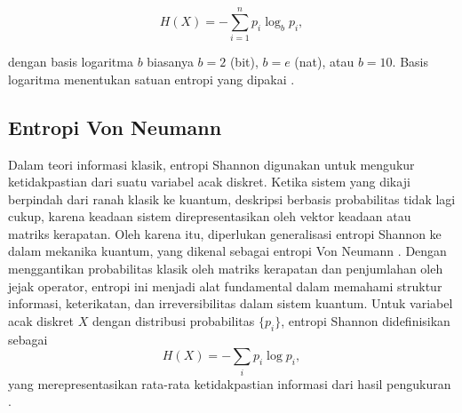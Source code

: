 \begin{equation}
H(X) = -\sum_{i=1}^{n} p_i \log_b p_i,
\label{eq:entropi-shannon}
\end{equation}

dengan basis logaritma \(b\) biasanya \(b=2\) (bit), \(b=e\) (nat), atau \(b=10\). Basis logaritma menentukan satuan entropi yang dipakai \cite{shannon1948mathematical,cover2006elements}.

\subsection{Entropi Von Neumann}
\par
Dalam teori informasi klasik, entropi Shannon digunakan untuk mengukur ketidakpastian dari suatu variabel acak diskret. Ketika sistem yang dikaji berpindah dari ranah klasik ke kuantum, deskripsi berbasis probabilitas tidak lagi cukup, karena keadaan sistem direpresentasikan oleh vektor keadaan atau matriks kerapatan. Oleh karena itu, diperlukan generalisasi entropi Shannon ke dalam mekanika kuantum, yang dikenal sebagai entropi Von Neumann \cite{vonNeumann1927, nielsen2010quantum}. Dengan menggantikan probabilitas klasik oleh matriks kerapatan dan penjumlahan oleh jejak operator, entropi ini menjadi alat fundamental dalam memahami struktur informasi, keterikatan, dan irreversibilitas dalam sistem kuantum. Untuk variabel acak diskret $X$ dengan distribusi probabilitas $\{p_i\}$, entropi Shannon didefinisikan sebagai
\begin{equation}
H(X) = -\sum_i p_i \log p_i,
\label{eq:shannon}
\end{equation}
yang merepresentasikan rata-rata ketidakpastian informasi dari hasil pengukuran \cite{shannon1948mathematical}.

